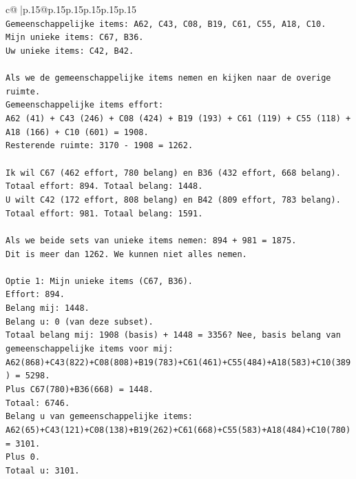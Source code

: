\documentclass{article}
\begin{document}
{\begin{supertabular}{c@{$\;$}|p{.15\linewidth}@{}p{.15\linewidth}p{.15\linewidth}p{.15\linewidth}p{.15\linewidth}p{.15\linewidth}}
{{{\\ 
\texttt{Gemeenschappelijke items: A62, C43, C08, B19, C61, C55, A18, C10.} \\
\texttt{Mijn unieke items: C67, B36.} \\
\texttt{Uw unieke items: C42, B42.} \\
\\ 
\texttt{Als we de gemeenschappelijke items nemen en kijken naar de overige ruimte.} \\
\texttt{Gemeenschappelijke items effort:} \\
\texttt{A62 (41) + C43 (246) + C08 (424) + B19 (193) + C61 (119) + C55 (118) + A18 (166) + C10 (601) = 1908.} \\
\texttt{Resterende ruimte: 3170 {-} 1908 = 1262.} \\
\\ 
\texttt{Ik wil C67 (462 effort, 780 belang) en B36 (432 effort, 668 belang). Totaal effort: 894. Totaal belang: 1448.} \\
\texttt{U wilt C42 (172 effort, 808 belang) en B42 (809 effort, 783 belang). Totaal effort: 981. Totaal belang: 1591.} \\
\\ 
\texttt{Als we beide sets van unieke items nemen: 894 + 981 = 1875.} \\
\texttt{Dit is meer dan 1262. We kunnen niet alles nemen.} \\
\\ 
\texttt{Optie 1: Mijn unieke items (C67, B36).} \\
\texttt{Effort: 894.} \\
\texttt{Belang mij: 1448.} \\
\texttt{Belang u: 0 (van deze subset).} \\
\texttt{Totaal belang mij: 1908 (basis) + 1448 = 3356? Nee, basis belang van gemeenschappelijke items voor mij:} \\
\texttt{A62(868)+C43(822)+C08(808)+B19(783)+C61(461)+C55(484)+A18(583)+C10(389) = 5298.} \\
\texttt{Plus C67(780)+B36(668) = 1448.} \\
\texttt{Totaal: 6746.} \\
\texttt{Belang u van gemeenschappelijke items:} \\
\texttt{A62(65)+C43(121)+C08(138)+B19(262)+C61(668)+C55(583)+A18(484)+C10(780) = 3101.} \\
\texttt{Plus 0.} \\
\texttt{Totaal u: 3101.} \\
\\ 
}}}
\end{supertabular}}
\end{document}
